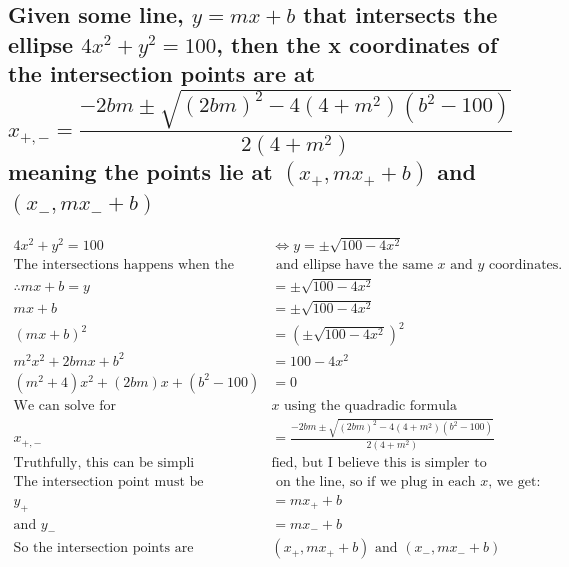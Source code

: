 \documentclass[11pt, oneside]{article}   	%
\begin{document}
\subsection{Given some line, $y=mx+b$ that intersects the ellipse $4x^2+y^2=100$, then the x coordinates of the 
intersection points are at $$x_{+,-} = \frac{-2bm \pm \sqrt{(2bm)^2 - 4(4+m^2)(b^2 - 100)}}{2(4 + m^2)}$$ 
meaning the points lie at $(x_+,mx_++b)$ and $(x_-, mx_- + b)$}
	\begin{align*}
		4x^2 + y^2 = 100 &\iff y = \pm \sqrt{100-4x^2 }\\
		\text{The intersections happens when the line}&\text{ and ellipse have the same $x$ and $y$ coordinates.}\\
		\therefore mx+b = y &= \pm \sqrt{100 - 4x^2}\\
		mx+b  &= \pm \sqrt{100 - 4x^2}\\
		(mx+b)^2 &= (\pm\sqrt{100 - 4x^2})^2\\
		m^2x^2 + 2bmx + b^2 &= 100 - 4x^2\\
		(m^2 + 4)x^2 + (2bm)x + (b^2 - 100) &= 0\\
		\text{We can solve for }&x\text{ using the quadradic formula}\\
		x_{+,-} &= \frac{-2bm \pm \sqrt{(2bm)^2 - 4(4+m^2)(b^2 - 100)}}{2(4 + m^2)}\\
		\text{Truthfully, this can be simpli}&\text{fied, but I believe this is simpler to compute.}\\
		\text{The intersection point must be}&\text{ on the line, so if we plug in each $x$, we get:}\\
		y_+ &= mx_++b\\
		\text{and }y_- &= mx_- + b\\
		\text{So the intersection points are }&(x_+,mx_++b) \text{ and }(x_-, mx_- + b)
	\end{align*}

\newpage
\end{document}

